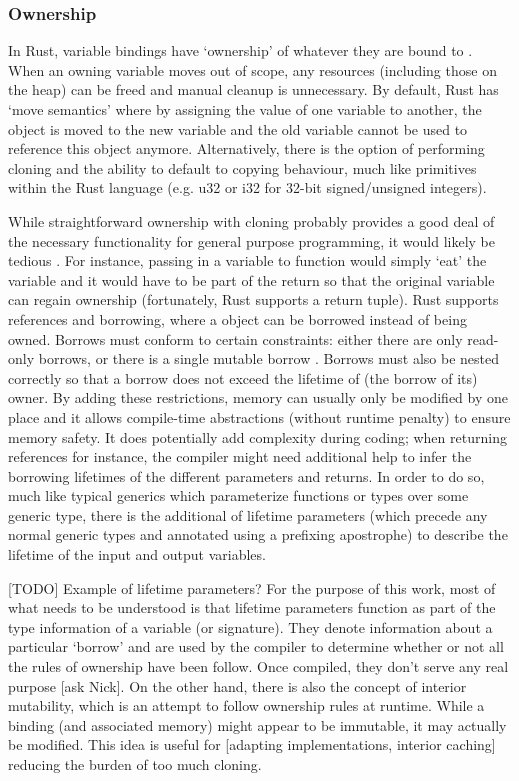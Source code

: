 \subsubsection{Ownership}
In Rust, variable bindings have `ownership' of whatever they are bound to \cite{docowner15}\cite{rustbook15}. When an owning variable moves out of scope, any resources (including those on the heap) can be freed and manual cleanup is unnecessary. By default, Rust has `move semantics' where by assigning the value of one variable to another, the object is moved to the new variable and the old variable cannot be used to reference this object anymore. Alternatively, there is the option of performing cloning and the ability to default to copying behaviour, much like primitives within the Rust language (e.g. u32 or i32 for 32-bit signed/unsigned integers).

While straightforward ownership with cloning probably provides a good deal of the necessary functionality for general purpose programming, it would likely be tedious \cite{docowner15}. For instance, passing in a variable to function would simply `eat' the variable and it would have to be part of the return so that the original variable can regain ownership (fortunately, Rust supports a return tuple). Rust supports references and borrowing, where a object can be borrowed instead of being owned. Borrows must conform to certain constraints: either there are only read-only borrows, or there is a single mutable borrow \cite{docborrow15}. Borrows must also be nested correctly so that a borrow does not exceed the lifetime of (the borrow of its) owner. By adding these restrictions, memory can usually only be modified by one place and it allows compile-time abstractions (without runtime penalty) to ensure memory safety. It does potentially add complexity during coding; when returning references for instance, the compiler might need additional help to infer the borrowing lifetimes of the different parameters and returns. In order to do so, much like typical generics which parameterize functions or types over some generic type, there is the additional of lifetime parameters (which precede any normal generic types and annotated using a prefixing apostrophe) to describe the lifetime of the input and output variables.

[TODO] Example of lifetime parameters? For the purpose of this work, most of what needs to be understood is that lifetime parameters function as part of the type information of a variable (or signature). They denote information about a particular `borrow' and are used by the compiler to determine whether or not all the rules of ownership have been follow. Once compiled, they don't serve any real purpose [ask Nick]. On the other hand, there is also the concept of interior mutability, which is an attempt to follow ownership rules at runtime. While a binding (and associated memory) might appear to be immutable, it may actually be modified. This idea is useful for [adapting implementations, interior caching] reducing the burden of too much cloning.

